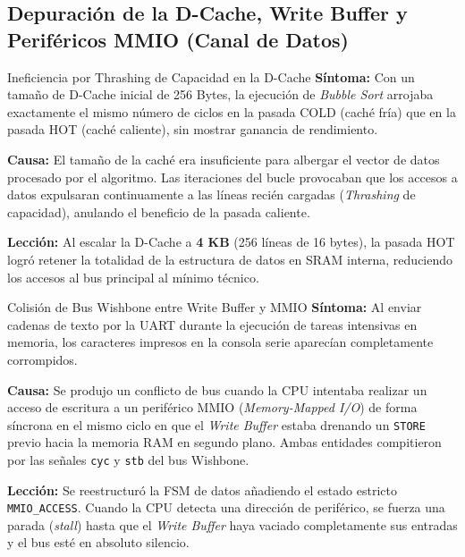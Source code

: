 \documentclass[10pt,a4paper]{article}
\begin{document}
\subsection{Depuración de la D-Cache, Write Buffer y Periféricos MMIO (Canal de Datos)}

\begin{bugbox}{Ineficiencia por Thrashing de Capacidad en la D-Cache}
    \textbf{Síntoma:} Con un tamaño de D-Cache inicial de 256 Bytes, la ejecución de \textit{Bubble Sort} arrojaba exactamente el mismo número de ciclos en la pasada
    COLD (caché fría) que en la pasada HOT (caché caliente), sin mostrar ganancia de rendimiento.

    \textbf{Causa:} El tamaño de la caché era insuficiente para albergar el vector de datos procesado por el algoritmo. Las iteraciones del bucle provocaban que
    los accesos a datos expulsaran continuamente a las líneas recién cargadas (\textit{Thrashing} de capacidad), anulando el beneficio de la pasada caliente.

    \textbf{Lección:} Al escalar la D-Cache a \textbf{4 KB} (256 líneas de 16 bytes), la pasada HOT logró retener la totalidad de la estructura de
    datos en SRAM interna, reduciendo los accesos al bus principal al mínimo técnico.
\end{bugbox}

\begin{bugbox}{Colisión de Bus Wishbone entre Write Buffer y MMIO}
    \textbf{Síntoma:} Al enviar cadenas de texto por la UART durante la ejecución de tareas intensivas en memoria, los caracteres impresos en la consola serie
    aparecían completamente corrompidos.

    \textbf{Causa:} Se produjo un conflicto de bus cuando la CPU intentaba realizar un acceso de escritura a un periférico MMIO (\textit{Memory-Mapped I/O})
    de forma síncrona en el mismo ciclo en que el \textit{Write Buffer} estaba drenando un \texttt{STORE} previo hacia la memoria RAM en segundo plano. Ambas
    entidades compitieron por las señales \texttt{cyc} y \texttt{stb} del bus Wishbone.

    \textbf{Lección:} Se reestructuró la FSM de datos añadiendo el estado estricto \texttt{MMIO\_ACCESS}. Cuando la CPU detecta una dirección de
    periférico, se fuerza una parada (\textit{stall}) hasta que el \textit{Write Buffer} haya vaciado completamente sus entradas y el bus esté en absoluto silencio.
\end{bugbox}
\end{document}
